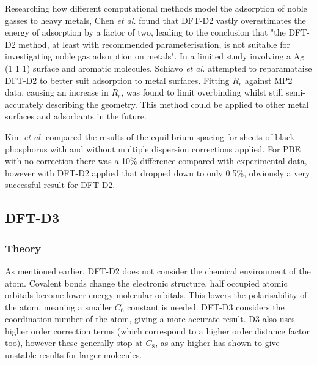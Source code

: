 \documentclass[10pt,a4paper,twocolumn,twoside]{extarticle}
\newcommand{\al}{\emph{et al. }}
\begin{document}
	Researching how different computational methods model the adsorption of noble gasses to heavy metals, Chen \emph{et al.} found that DFT-D2 vastly overestimates the energy of adsorption by a factor of two, leading to the conclusion that "the DFT-D2 method, at least with recommended parameterisation, is not suitable for investigating noble gas adsorption on metals".\cite{Chen2012} 
	In a limited study involving a Ag (1 1 1) surface and aromatic molecules, Schiavo \al attempted to reparamataise DFT-D2 to better suit adsorption to metal surfaces. Fitting $R_r$ against MP2 data, causing an increase in $R_r$, was found to limit overbinding whilst still semi-accurately describing the geometry.\cite{Schiavo2018} This method could be applied to other metal surfaces and adsorbants in the future. 

	Kim \emph{et al.} compared the results of the equilibrium spacing for sheets of black phosphorus with and without multiple dispersion corrections applied. For PBE with no correction there was a 10\% difference compared with experimental data, however with DFT-D2 applied that dropped down to only 0.5\%, obviously a very successful result for DFT-D2.\cite{Kim2014} 

	\subsection{DFT-D3}
	\subsubsection{Theory}
	As mentioned earlier, DFT-D2 does not consider the chemical environment of the atom. Covalent bonds change the electronic structure, half occupied atomic orbitals become lower energy molecular orbitals. This lowers the polarisability of the atom, meaning a smaller $C_6$ constant is needed. DFT-D3 considers the coordination number of the atom, giving a more accurate result. \cite{Grimme2010} D3 also uses higher order correction terms (which correspond to a higher order distance factor too), however these generally stop at $C_8$, as any higher has shown to give unstable results for larger molecules.
\end{document}
